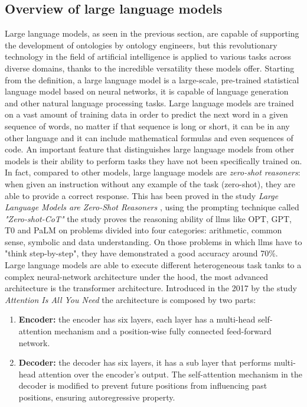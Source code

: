 \subsection{Overview of large language models}
Large language models, as seen in the previous section, are capable of supporting the development of ontologies by ontology engineers, but this revolutionary technology in the field of artificial intelligence is applied to various tasks across diverse domains, thanks to the incredible versatility these models offer. Starting from the definition, a large language model is a large-scale, pre-trained statistical language model based on neural networks, it is capable of language generation and other natural language processing tasks.\cite{llm_wiki} Large language models are trained on a vast amount of training data in order to predict the next word in a given sequence of words, no matter if that sequence is long or short, it can be in any other language and it can include mathematical formulas and even sequences of code.\cite{llm_medium} An important feature that distinguishes large language models from other models is their ability to perform tasks they have not been specifically trained on. In fact, compared to other models, large language models are \textit{zero-shot reasoners}: when given an instruction without any example of the task (zero-shot), they are able to provide a correct response. This has been proved in the study \textit{Large Language Models are Zero-Shot Reasoners} \cite{kojima2022large}, using the prompting technique called \textit{"Zero-shot-CoT"} the study proves the reasoning ability of llms like OPT, GPT, T0 and PaLM on problems divided into four categories: arithmetic, common sense, symbolic and data understanding. On those problems in which llms have to "think step-by-step", they have demonstrated a good accuracy around 70\%.\\
Large language models are able to execute different heterogeneous task tanks to a complex neural-network architecture under the hood, the most advanced architecture is the transformer architecture. Introduced in the 2017 by the study \textit{Attention Is All You Need}\cite{vaswani2017attention} the architecture is composed by two parts:
\begin{enumerate}
    \item \textbf{Encoder:} the encoder has six layers, each layer has a multi-head self-attention mechanism and a position-wise fully connected feed-forward network.

    \item \textbf{Decoder:} the decoder has six layers, it has a sub layer that performs multi-head attention over the encoder’s output. The self-attention mechanism in the decoder is modified to prevent future positions from influencing past positions, ensuring autoregressive property.
\end{enumerate}
